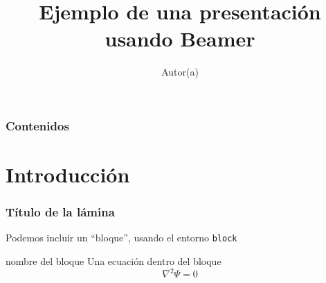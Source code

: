 \documentclass[hyperref={colorlinks},aspectratio=169]{beamer}
\begin{document}
\title{Ejemplo de una presentación usando Beamer}
\author[iniciales de autor(a)]{Autor(a)} 
\frame{\titlepage}

\begin{frame}
\frametitle{Contenidos}
\tableofcontents
\end{frame}


\section{Introducción}
\begin{frame}[fragile]\frametitle{Título de la lámina}
Podemos incluir un ``bloque'', usando el entorno \texttt{block}
\begin{block}{nombre del bloque}
Una ecuación dentro del bloque
\begin{equation}
\nabla^2\Psi=0
\end{equation}
\end{block}
\end{frame}
\end{document}
